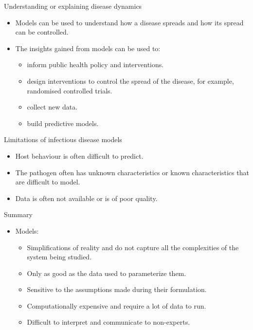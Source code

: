 \documentclass[
  ignorenonframetext,
]{beamer}
\providecommand{\tightlist}{%
  \setlength{\itemsep}{0pt}\setlength{\parskip}{0pt}}\usepackage{longtable,booktabs,array}
\begin{document}
\begin{frame}
\begin{block}{Understanding or explaining disease dynamics}
\label{understanding-or-explaining-disease-dynamics}
\begin{itemize}
\tightlist
\item
  Models can be used to understand how a disease spreads and how its
  spread can be controlled.
\item
  The insights gained from models can be used to:

  \begin{itemize}
  \tightlist
  \item
    inform public health policy and interventions.
  \item
    design interventions to control the spread of the disease, for
    example, randomised controlled trials.
  \item
    collect new data.
  \item
    build predictive models.
  \end{itemize}
\end{itemize}
\end{block}

\begin{block}{Limitations of infectious disease models}
\label{limitations-of-infectious-disease-models}
\begin{itemize}
\tightlist
\item
  Host behaviour is often difficult to predict.
\item
  The pathogen often has unknown characteristics or known
  characteristics that are difficult to model.
\item
  Data is often not available or is of poor quality.
\end{itemize}
\end{block}
\end{frame}

\begin{frame}
\begin{block}{Summary}
\label{summary}
\begin{itemize}
\tightlist
\item
  Models:

  \begin{itemize}
  \tightlist
  \item
    {Simplifications of reality} and do not capture all the
    {complexities} of the system being studied.
  \item
    Only as good as the {data} used to parameterize them.
  \item
    Sensitive to the {assumptions} made during their formulation.
  \item
    {Computationally expensive} and require a lot of data to run.
  \item
    {Difficult to interpret} and communicate to non-experts.
  \end{itemize}
\end{itemize}
\end{block}
\end{frame}
\end{document}
